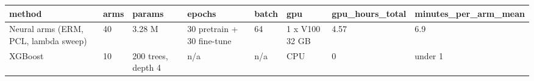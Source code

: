 \begin{tabular}{llllllll}
\hline
method & arms & params & epochs & batch & gpu & gpu\_hours\_total & minutes\_per\_arm\_mean \\
\hline
Neural arms (ERM, PCL, lambda sweep) & 40 & 3.28 M & 30 pretrain + 30 fine-tune & 64 & 1 x V100 32 GB & 4.57 & 6.9 \\
XGBoost & 10 & 200 trees, depth 4 & n/a & n/a & CPU & 0 & under 1 \\
\hline
\end{tabular}
